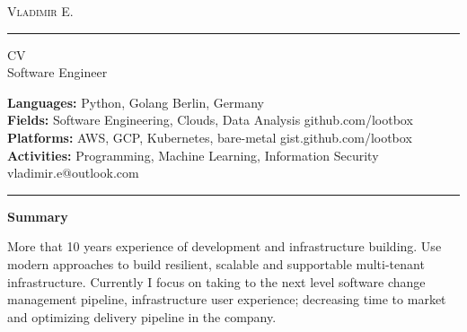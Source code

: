 \documentclass[10pt,A4]{article}
\newcommand{\cvsection}[1]
{
	\begin{center}
		\large\textcolor{sectcol}{\textbf{#1}}
	\end{center}
}
\newcommand{\metasection}[2]
{
\footnotesize{#2} \hspace*{\fill} \footnotesize{#1}\\[1pt]
}
\begin{document}
\pagestyle{fancy}	




\vspace{-8pt}
\begin{center}
	\HUGE \textsc{Vladimir E.} \textcolor{sectcol}{\rule[-1mm]{1mm}{0.9cm}} \textsc{CV}\\[2pt]
	\small Software Engineer
\end{center}

\vspace{6pt}

\metasection{Berlin, Germany}{\textbf{Languages:} Python, Golang}
\metasection{github.com/lootbox}{\textbf{Fields:} Software Engineering, Clouds, Data Analysis}
\metasection{gist.github.com/lootbox}{\textbf{Platforms:} AWS, GCP, Kubernetes, bare-metal}
\metasection{vladimir.e@outlook.com}{\textbf{Activities:} Programming, Machine Learning, Information Security}
\vspace{-2pt}
\textcolor{softcol}{\hrule}
\vspace{6pt}

\normalsize

\vspace{-6pt}
\cvsection{Summary}
More that 10 years experience of development and infrastructure building. Use modern approaches to build resilient, scalable and supportable multi-tenant infrastructure. Currently I focus on taking to the next level software change management pipeline, infrastructure user experience; decreasing time to market and optimizing delivery pipeline in the company.\\
\end{document}

